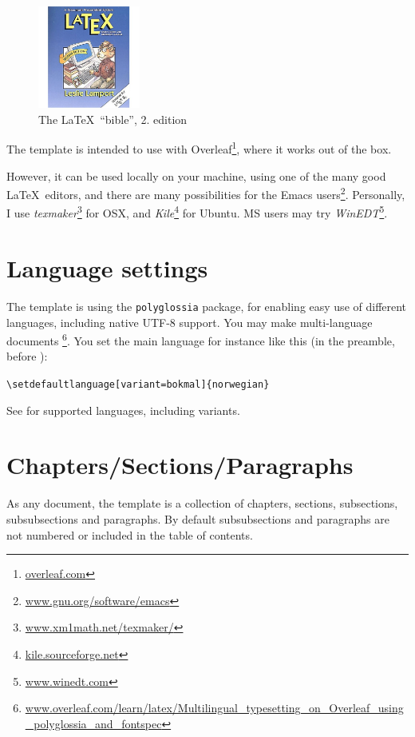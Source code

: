 \begin{figure}[!htbp]
\centering 
    \includegraphics[width=0.3\textwidth]{Graphics/lamport}
    \caption{The \LaTeX\ ``bible'', 2. edition \label{fig:lamport}}
\end{figure}


The template is intended to use with Overleaf\footnote{\url{overleaf.com}}, where it works out of the box.

However, it can be used locally on your machine, using one of the many good \LaTeX\ editors, and there are many possibilities for the Emacs users\footnote{\url{www.gnu.org/software/emacs}}. Personally, I use {\em texmaker}\footnote{\url{www.xm1math.net/texmaker/}}
for OSX, and 
{\em Kile}\footnote{\url{kile.sourceforge.net}}
for Ubuntu. MS users may try {\em WinEDT}\footnote{\url{www.winedt.com}}.


\section{Language settings}

The template is using the \texttt{polyglossia} package, for enabling easy use of different languages, including native UTF-8 support. You may make multi-language documents \footnote{\url{www.overleaf.com/learn/latex/Multilingual_typesetting_on_Overleaf_using_polyglossia_and_fontspec}}. You set the main language for instance like this (in the preamble, before \verb||):

\verb|\setdefaultlanguage[variant=bokmal]{norwegian}|

See \cite[p.~6]{polyglossia} for supported languages, including variants.

\section{Chapters/Sections/Paragraphs}

As any document, the template is a collection of chapters, sections, subsections, subsubsections and paragraphs. By default subsubsections and paragraphs are not numbered or included in the table of contents. 

